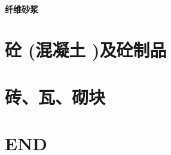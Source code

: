 \documentclass[UTF8]{../../ApplicationUniverse}
\begin{document}
    \subsubsection{纤维砂浆}






\chapter{砼 (混凝土 )及砼制品}



\chapter{砖、瓦、砌块}







\chapter{END}
\end{document}
